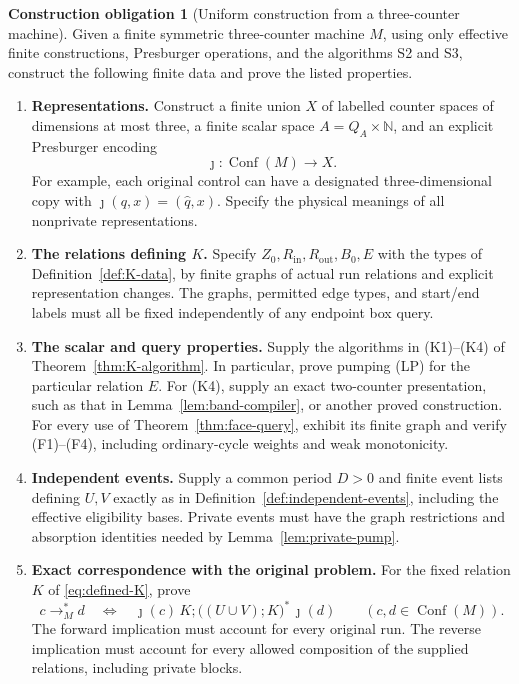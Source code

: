 \documentclass[11pt,a4paper]{article}
\theoremstyle{definition}
\newtheorem{obligation}[theorem]{Construction obligation}
\theoremstyle{remark}
\newcommand{\N}{\mathbb N}
\begin{document}
\begin{obligation}[Uniform construction from a three-counter machine]
\label{obl:construction}
Given a finite symmetric three-counter machine \(M\), using only
effective finite constructions, Presburger operations, and the
algorithms S2 and S3, construct the following finite data and prove
the listed properties.
\begin{enumerate}[label=\textnormal{(C\arabic*)},leftmargin=*]
\item \textbf{Representations.}
Construct a finite union \(X\) of labelled counter spaces of
dimensions at most three, a finite scalar space \(A=Q_A\times\N\),
and an explicit Presburger encoding
\[
 \jmath:\operatorname{Conf}(M)\longrightarrow X.
\]
For example, each original control can have a designated
three-dimensional copy with \(\jmath(q,x)=(\widehat q,x)\).
Specify the physical meanings of all nonprivate representations.

\item \textbf{The relations defining \(K\).}
Specify \(Z_0,R_{\mathrm{in}},R_{\mathrm{out}},B_0,E\) with the
types of Definition~\ref{def:K-data}, by finite graphs of actual
run relations and explicit representation changes.
The graphs, permitted edge types, and start/end labels must all be
fixed independently of any endpoint box query.

\item \textbf{The scalar and query properties.}
Supply the algorithms in (K1)--(K4) of
Theorem~\ref{thm:K-algorithm}. In particular, prove pumping (LP)
for the particular relation \(E\).
For (K4), supply an exact two-counter presentation, such as that in
Lemma~\ref{lem:band-compiler}, or another proved construction.
For every use of Theorem~\ref{thm:face-query}, exhibit its finite
graph and verify (F1)--(F4), including ordinary-cycle weights and
weak monotonicity.

\item \textbf{Independent events.}
Supply a common period \(D>0\) and finite event lists defining
\(U,V\) exactly as in Definition~\ref{def:independent-events},
including the effective eligibility bases.
Private events must have the graph restrictions and absorption
identities needed by Lemma~\ref{lem:private-pump}.

\item \textbf{Exact correspondence with the original problem.}
For the fixed relation \(K\) of \eqref{eq:defined-K}, prove
\begin{equation}
 c\longrightarrow_M^*d
 \quad\Longleftrightarrow\quad
 \jmath(c)\,
 K;\bigl((U\cup V);K\bigr)^*
 \,\jmath(d)
 \qquad(c,d\in\operatorname{Conf}(M)).
 \label{eq:machine-equivalence}
\end{equation}
The forward implication must account for every original run.
The reverse implication must account for every allowed composition
of the supplied relations, including private blocks.
\end{enumerate}
\end{obligation}
\end{document}
